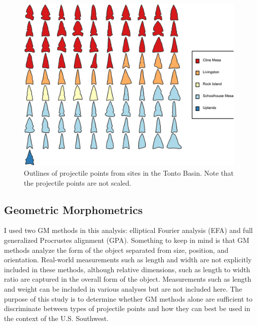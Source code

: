\documentclass[a4paper]{article}
\begin{document}
\begin{figure}
\includegraphics[width=1\linewidth]{figures/TontoPointsFinal} \caption{Outlines of projectile points from sites in the Tonto Basin. Note that the projectile points are not scaled.}\label{fig:TontoPointsFinal}
\end{figure}

\hypertarget{geometric-morphometrics}{%
\subsection*{Geometric Morphometrics}\label{geometric-morphometrics}}

I used two GM methods in this analysis: elliptical Fourier analysis (EFA) and full generalized Procrustes alignment (GPA). Something to keep in mind is that GM methods analyze the form of the object separated from size, position, and orientation. Real-world measurements such as length and width are not explicitly included in these methods, although relative dimensions, such as length to width ratio are captured in the overall form of the object. Measurements such as length and weight can be included in various analyses but are not included here. The purpose of this study is to determine whether GM methods alone are sufficient to discriminate between types of projectile points and how they can best be used in the context of the U.S. Southwest.
\end{document}

